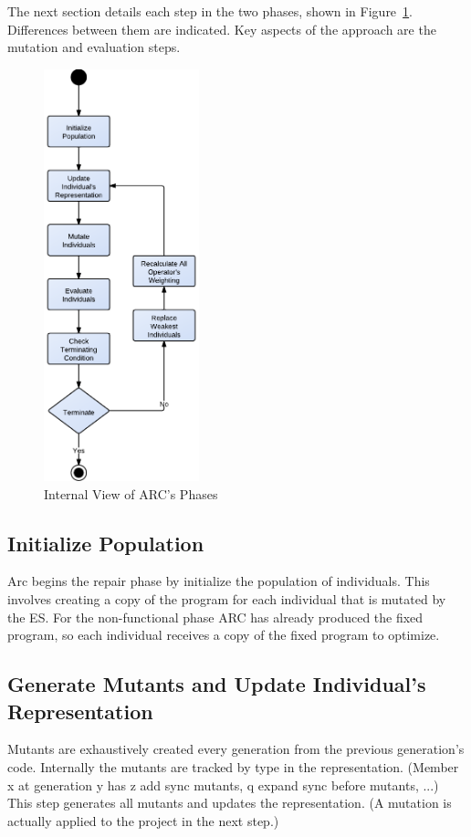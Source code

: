 \documentclass[10pt, conference, compsocconf]{IEEEtran}
\begin{document}
The next section details each step in the two phases, shown in Figure~\ref{fig:phases_internals}. Differences between them are indicated.  Key aspects of the approach are the mutation and evaluation steps.

\begin{figure}[!h]
  \centering
  \includegraphics[width=4.50cm]{figures/phases.pdf}
  \caption{Internal View of ARC's Phases}
  \label{fig:phases_internals}
\end{figure}

\subsection{Initialize Population}
\label{sec:initialize_population}

Arc begins the repair phase by initialize the population of individuals. 
This involves creating a copy of the program for each individual that is
mutated by the ES. For the non-functional phase ARC has already produced
the fixed program, so each individual receives a copy of the fixed 
program to optimize.

\subsection{Generate Mutants and Update Individual's Representation}
\label{sec:update_individual_representation}

Mutants are exhaustively created every generation from the previous generation's code. Internally the mutants are tracked by type in the representation.  (Member x at generation y has z add sync mutants, q expand sync before mutants, ...) This step generates all mutants and updates the representation. (A mutation is actually applied to the project in the next step.)
\end{document}
